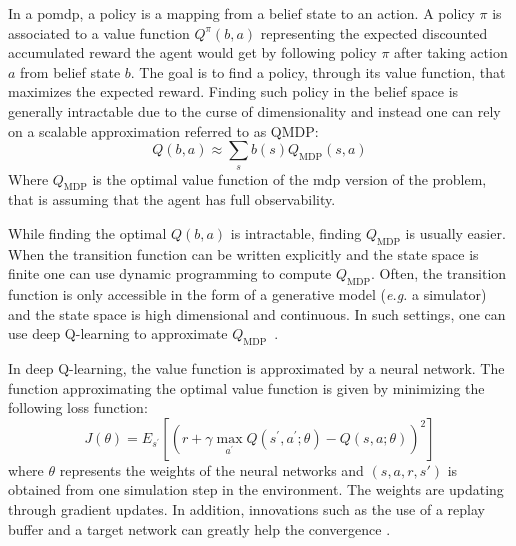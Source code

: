 	In a \gls{pomdp}, a policy is a mapping from a belief state to an action. A policy $\pi$ is associated to a value function $Q^\pi(b, a)$ representing the expected discounted accumulated reward the agent would get by following policy $\pi$ after taking action $a$ from belief state $b$.
	The goal is to find a policy, through its value function, that maximizes the expected reward.
	Finding such policy in the belief space is generally intractable due to the curse of dimensionality \cite{Kochenderfer2015} and instead one can rely on a scalable approximation referred to as QMDP:
	\begin{equation}
		Q(b, a) \approx \sum_s b(s) Q_{\mathrm{MDP}}(s, a)
		\label{eq:qmdp}
	\end{equation}
	Where $Q_{\mathrm{MDP}}$ is the optimal value function of the \gls{mdp} version of the problem, that is assuming that the agent has full observability. 
	
	While finding the optimal $Q(b, a)$ is intractable, finding $Q_{\mathrm{MDP}}$ is usually easier. 
	When the transition function can be written explicitly and the state space is finite one can use dynamic programming to compute $Q_{\mathrm{MDP}}$. 
	Often, the transition function is only accessible in the form of a generative model (\textit{e.g.} a simulator) and the state space is high dimensional and continuous. 
	In such settings, one can use deep Q-learning to approximate $Q_{\mathrm{MDP}}$~\cite{LITTMAN1995}. 
	
	In deep Q-learning, the value function is approximated by a neural network. The function approximating the optimal value function is given by minimizing the following loss function:
	\begin{equation}
		J(\theta) = E_{s^\prime}[(r + \gamma \max_{a^\prime}Q(s^\prime, a^\prime; \theta) - Q(s, a; \theta))^2]
		\label{eq:dqn-loss}
	\end{equation}
	where $\theta$ represents the weights of the neural networks and $(s, a, r, s')$ is obtained from one simulation step in the environment. 
	The weights are updating through gradient updates. 
	In addition, innovations such as the use of a replay buffer and a target network can greatly help the convergence \cite{Mnih2015}. 
	
